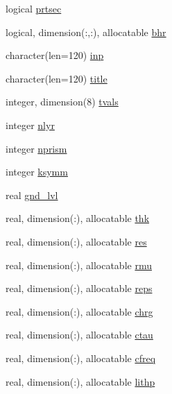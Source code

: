 \begin{DoxyCompactItemize}
\item 
logical \hyperlink{namespacemg__input__routines_a341f268b2c10aec79f94e1cec9e49f24}{prtsec}
\item 
logical, dimension(\+:,\+:), allocatable \hyperlink{namespacemg__input__routines_ab21b53ae17d7a35ba5def7f4466da62d}{bhr}
\item 
character(len=120) \hyperlink{namespacemg__input__routines_a8e5e63f1a08c24f363056fa6ddf7b302}{inp}
\item 
character(len=120) \hyperlink{namespacemg__input__routines_ad134a146aceaea3fe8797e03a5b2c1d8}{title}
\item 
integer, dimension(8) \hyperlink{namespacemg__input__routines_aa5b99396ff2ca0434263e6b60c15dbf4}{tvals}
\item 
integer \hyperlink{namespacemg__input__routines_a63f2aa3d62b92a05e5c5122cb74900b1}{nlyr}
\item 
integer \hyperlink{namespacemg__input__routines_ae039cf2b2315725a320ddc429e0f22ca}{nprism}
\item 
integer \hyperlink{namespacemg__input__routines_ad66a5f5acff5c1b06da85bb8a46384cd}{ksymm}
\item 
real \hyperlink{namespacemg__input__routines_a11bf44e1f047050fb335bf4bfc8d1a2c}{gnd\+\_\+lvl}
\item 
real, dimension(\+:), allocatable \hyperlink{namespacemg__input__routines_a5f1ec34f2ee179ae5c4b6881a70b2d53}{thk}
\item 
real, dimension(\+:), allocatable \hyperlink{namespacemg__input__routines_ae35231b83c0ec2f647d41d0a580e1a6b}{res}
\item 
real, dimension(\+:), allocatable \hyperlink{namespacemg__input__routines_ad461ceb35202bc6d598545f113643699}{rmu}
\item 
real, dimension(\+:), allocatable \hyperlink{namespacemg__input__routines_a399ade44d53bab22b1416c1c143a807a}{reps}
\item 
real, dimension(\+:), allocatable \hyperlink{namespacemg__input__routines_a45b54b5e8dc7da41f04656a21595105c}{chrg}
\item 
real, dimension(\+:), allocatable \hyperlink{namespacemg__input__routines_a677ccea5b7c4699e0d7c0620fb4473c7}{ctau}
\item 
real, dimension(\+:), allocatable \hyperlink{namespacemg__input__routines_a942bb74999b46c3142791ee0bc5420a0}{cfreq}
\item 
real, dimension(\+:), allocatable \hyperlink{namespacemg__input__routines_ace92ffb4ec110b849313b8e1fdc6893a}{lithp}
\item 

\end{DoxyCompactItemize}
